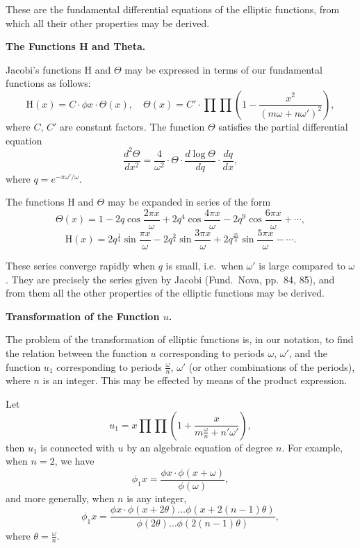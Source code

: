 \documentclass[11pt,a4paper]{book}
\begin{document}
These are the fundamental differential equations of the elliptic functions, from which
all their other properties may be derived.

\medskip

\textbf{The Functions H and Theta.}

Jacobi's functions $\mathrm{H}$ and $\Theta$ may be expressed in terms of our fundamental
functions as follows:
\[
\mathrm{H}(x) = C \cdot \phi x \cdot \Theta(x),\quad \Theta(x) = C' \cdot \prod \prod \left(1 - \frac{x^2}{(m\omega + n\omega')^2}\right),
\]
where $C$, $C'$ are constant factors. The function $\Theta$ satisfies the partial differential
equation
\[
\frac{d^2 \Theta}{dx^2} = \frac{4}{\omega^2} \cdot \Theta \cdot \frac{d \log \Theta}{dq} \cdot \frac{dq}{dx},
\]
where $q = e^{-\pi \omega'/\omega}$.

\newpage
\setcounter{page}{145}

The functions $\mathrm{H}$ and $\Theta$ may be expanded in series of the form
\[
\Theta(x) = 1 - 2q \cos\frac{2\pi x}{\omega} + 2q^4 \cos\frac{4\pi x}{\omega} - 2q^9 \cos\frac{6\pi x}{\omega} + \cdots,
\]
\[
\mathrm{H}(x) = 2q^{\frac{1}{4}} \sin\frac{\pi x}{\omega} - 2q^{\frac{9}{4}} \sin\frac{3\pi x}{\omega} + 2q^{\frac{25}{4}} \sin\frac{5\pi x}{\omega} - \cdots.
\]

These series converge rapidly when $q$ is small, i.e.\ when $\omega'$ is large compared to $\omega$.
They are precisely the series given by Jacobi (Fund.\ Nova, pp.~84, 85), and from
them all the other properties of the elliptic functions may be derived.

\medskip

\textbf{Transformation of the Function $u$.}

The problem of the transformation of elliptic functions is, in our notation, to find
the relation between the function $u$ corresponding to periods $\omega$, $\omega'$, and the function
$u_1$ corresponding to periods $\frac{\omega}{n}$, $\omega'$ (or other combinations of the periods), where $n$ is
an integer. This may be effected by means of the product expression.

\newpage
\setcounter{page}{146}

Let
\[
u_1 = x \prod \prod \left(1 + \frac{x}{m\frac{\omega}{n} + n'\omega'}\right),\]
then $u_1$ is connected with $u$ by an algebraic equation of degree $n$. For example,
when $n = 2$, we have
\[
\phi_1 x = \frac{\phi x \cdot \phi(x + \omega)}{\phi(\omega)},
\]
and more generally, when $n$ is any integer,
\[
\phi_1 x = \frac{\phi x \cdot \phi(x + 2\theta) \ldots \phi(x + 2(n-1)\theta)}{\phi(2\theta) \ldots \phi(2(n-1)\theta)},
\]
where $\theta = \frac{\omega}{n}$.
\end{document}
